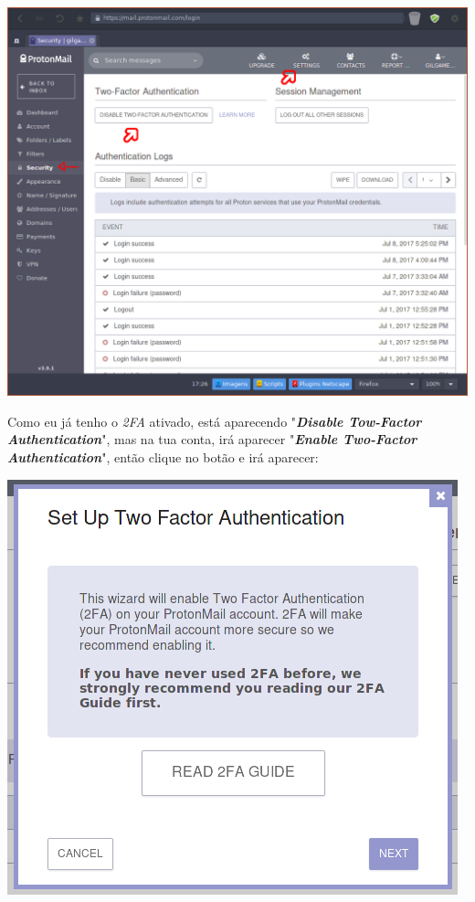 \documentclass[12pt, letterpaper, DejaVuSansMono:12]{report}
\begin{document}
	\begin{center}
		\includegraphics[scale=0.53]{proton.png}
	\end{center}

	Como eu já tenho o \textit{2FA} ativado, está aparecendo "\textit{\textbf{Disable Tow-Factor Authentication}}", mas na tua conta, irá aparecer "\textit{\textbf{Enable Two-Factor Authentication}}", então clique no botão e irá aparecer:

	\begin{center}
		\includegraphics[scale=0.55]{proton2.png}
	\end{center}
\end{document}
